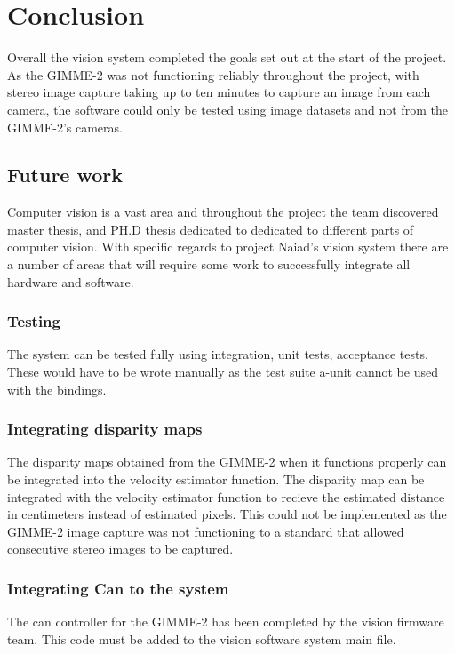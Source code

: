 \section{Conclusion}\label{sec:conclusion}
Overall the vision system completed the goals set out at the start of the project. As the GIMME-2 was not functioning reliably throughout the project, with stereo image capture taking up to ten minutes to capture an image from each camera, the software could only be tested using image datasets and not from the GIMME-2's cameras. 
\subsection{Future work}
Computer vision is a vast area and throughout the project the team discovered master thesis, and PH.D thesis dedicated to dedicated to different parts of computer vision. With specific regards to project Naiad's vision system there are a number of areas that will require some work to successfully integrate all hardware and software.
\subsubsection{Testing}
The system can be tested fully using integration, unit tests, acceptance tests. These would have to be wrote manually as the test suite a-unit cannot be used with the bindings.

\subsubsection{Integrating disparity maps}
The disparity maps obtained from the GIMME-2 when it functions properly can be integrated into the velocity estimator function.
The disparity map can be integrated with the velocity estimator function to recieve the estimated distance in centimeters instead of estimated pixels. This could not be implemented as the GIMME-2 image capture was not functioning to a standard that allowed consecutive stereo images to be captured.

\subsubsection{Integrating Can to the system}
The can controller for the GIMME-2 has been completed by the vision firmware team. This code must be added to the vision software system main file.


